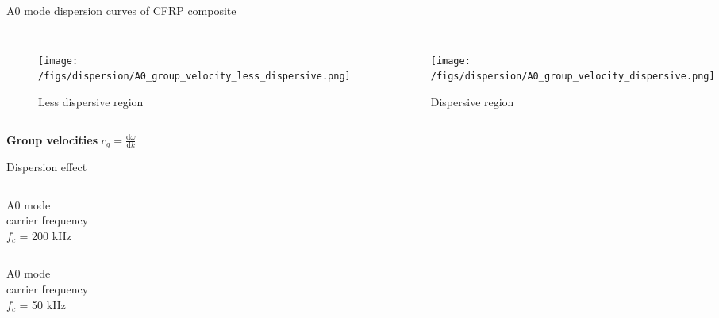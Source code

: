 \documentclass[10pt,aspectratio=169,dvipsnames]{beamer} %
\begin{document}
\begin{frame}{A0 mode dispersion curves of CFRP composite}
	\begin{columns}[T]
			\begin{figure}
				\texttt{[image: /figs/dispersion/A0\_group\_velocity\_less\_dispersive.png]}
				\caption{Less dispersive region}
			\end{figure}
			\begin{figure}
				\texttt{[image: /figs/dispersion/A0\_group\_velocity\_dispersive.png]}
				\caption{Dispersive region}
			\end{figure}
	\end{columns}
	\begin{center}
	\textbf{Group velocities} $c_g = \frac{\textrm{d}\omega}{\textrm{d}k}$
	\end{center}	
\end{frame}
\begin{frame}{Dispersion effect}
	\begin{columns}[c]
		\begin{column}{0.2\textwidth}
			\centering
			A0 mode \\carrier frequency \\$f_c$ = 200 kHz
		\end{column}
		\begin{column}{0.8\textwidth}
			\begin{figure}
			\end{figure}
		\end{column}
	\end{columns}
	\begin{columns}[c]
		\begin{column}{0.2\textwidth}
			\centering
			A0 mode \\carrier frequency \\$f_c$ = 50 kHz
		\end{column}
		\begin{column}{0.8\textwidth}
			\begin{figure}
			\end{figure}
		\end{column}
	\end{columns}
\end{frame}
\end{document}
